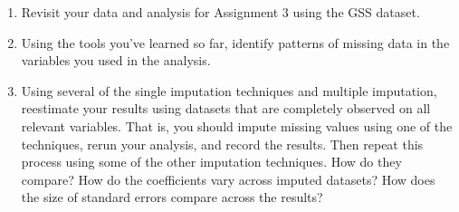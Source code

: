 \documentclass[a4paper,12pt]{article}
\begin{document}
\begin{enumerate}
\item Revisit your data and analysis for Assignment 3 using the GSS dataset.
\item Using the tools you've learned so far, identify patterns of missing data in the variables you used in the analysis.
\item Using several of the single imputation techniques and multiple imputation, reestimate your results using datasets that are completely observed on all relevant variables. That is, you should impute missing values using one of the techniques, rerun your analysis, and record the results. Then repeat this process using some of the other imputation techniques. How do they compare? How do the coefficients vary across imputed datasets? How does the size of standard errors compare across the results?


\end{enumerate}
\end{document}
